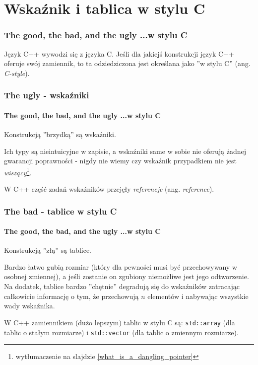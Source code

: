 \documentclass[aspectratio=169]{beamer}
\begin{document}
\section{Wskaźnik i tablica w stylu C}

\begin{frame}
    \frametitle{The good, the bad, and the ugly ...w stylu C}

    Język C++ wywodzi się z języka C. Jeśli dla jakiejś konstrukcji język C++
    oferuje swój zamiennik, to ta odziedziczona jest określana jako ''w stylu
    C'' (ang. \emph{C-style}).
\end{frame}

\begin{frame}
    \frametitle{The ugly - wskaźniki}
    \framesubtitle{The good, the bad, and the ugly ...w stylu C}

    Konstrukcją ''brzydką'' są wskaźniki.

    \vspace{1em}

    Ich typy są nieintuicyjne w zapisie, a wskaźniki same w sobie nie oferują
    żadnej gwarancji poprawności - nigdy nie wiemy czy wskaźnik przypadkiem nie
    jest \emph{wiszący}\footnote{wytłumaczenie na slajdzie
    \ref{what_is_a_dangling_pointer}}.

    \vspace{1em}

    W C++ część zadań wskaźników przejęły \emph{referencje} (ang.
    \emph{reference}).
\end{frame}

\begin{frame}
    \frametitle{The bad - tablice w stylu C}
    \framesubtitle{The good, the bad, and the ugly ...w stylu C}

    Konstrukcją ''złą'' są tablice.

    \vspace{1em}

    Bardzo łatwo gubią rozmiar (który dla pewności musi być przechowywany w
    osobnej zmiennej), a jeśli zostanie on zgubiony niemożliwe jest jego
    odtworzenie. Na dodatek, tablice bardzo ''chętnie'' degradują się do
    wskaźników zatracając całkowicie informację o tym, że przechowują $n$
    elementów i nabywając wszystkie wady wskaźnika.

    \vspace{1em}

    W C++ zamiennikiem (dużo lepszym) tablic w stylu C są: {\tt std::array} (dla
    tablic o stałym rozmiarze) i {\tt std::vector} (dla tablic o zmiennym
    rozmiarze).
\end{frame}
\end{document}
